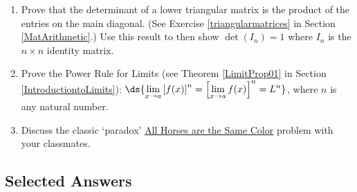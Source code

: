 \documentclass{ximera}
\begin{document}
\begin{enumerate}
\begin{enumerate}
\end{enumerate}

\item  Prove that the determinant of a lower triangular matrix is the product of the entries on the main diagonal.  (See Exercise \ref{triangularmatrices} in Section \ref{MatArithmetic}.)  Use this result to then show $\det\left(I_{n}\right) = 1$ where $I_{n}$ is the $n \times n$ identity matrix.

\item  \label{limitpowerruleproof} Prove the Power Rule for Limits (see Theorem \ref{LimitProp01} in Section \ref{IntroductiontoLimits}): $\ds{\lim_{x \rightarrow a} \left[f(x)\right]^{n} = \left[\lim_{x \rightarrow a} f(x) \right]^{n}= L^{n}}$, where $n$ is any natural number.

\item  Discuss the classic  `paradox' \href{http://en.wikipedia.org/wiki/All_horses_are_the_same_color}{\underline{All Horses are the Same Color}} problem with your classmates.

\end{enumerate}

\newpage

\subsection{Selected Answers}
\end{document}
